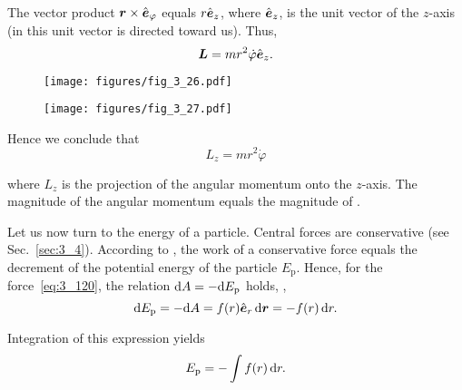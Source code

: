 \noindent
The vector product $\boldsymbol{r}\times\hat{\boldsymbol{e}}_{\varphi}$ equals $r\hat{\boldsymbol{e}}_{z}$, where $\hat{\boldsymbol{e}}_{z}$, is the unit vector of the $z$-axis (in  this unit vector is directed toward us). Thus,
\begin{equation}\label{eq:3_123}
\boldsymbol{L} = mr^2\dot{\varphi}\hat{\boldsymbol{e}}_{z}.
\end{equation}

\begin{figure}[t]
	\begin{minipage}[t]{0.5\linewidth}
		\begin{center}
			\texttt{[image: figures/fig\_3\_26.pdf]}
			\caption[]{}
			\label{fig:3_26}
		\end{center}
	\end{minipage}
	\hspace{-0.05cm}
	\begin{minipage}[t]{0.5\linewidth}
		\begin{center}
			\texttt{[image: figures/fig\_3\_27.pdf]}
			\caption[]{}
			\label{fig:3_27}
		\end{center}
	\end{minipage}
	\vspace{-0.3cm}
\end{figure}

\noindent
Hence we conclude that
\begin{equation}\label{eq:3_124}
L_z = mr^2\dot{\varphi}
\end{equation}

\noindent
where $L_z$ is the projection of the angular momentum onto the $z$-axis. The magnitude of the angular momentum equals the magnitude of .

Let us now turn to the energy of a particle. Central forces are conservative (see Sec.~\ref{sec:3_4}). According to , the work of a conservative force equals the decrement of the potential energy of the particle $E_{\text{p}}$. Hence, for the force~\eqref{eq:3_120}, the relation $\mathrm{d} A=-\mathrm{d} E_{\text{p}}$ holds, \ie,
\begin{equation*}
\mathrm{d} E_{\text{p}} = -\mathrm{d} A = f(r)\hat{\boldsymbol{e}}_{r}\,\mathrm{d}\boldsymbol{r} = -f(r)\,\mathrm{d} r.
\end{equation*}

\noindent
Integration of this expression yields
\begin{equation}\label{eq:3_125}
E_{\text{p}} = -\int f(r)\,\mathrm{d} r.
\end{equation}

